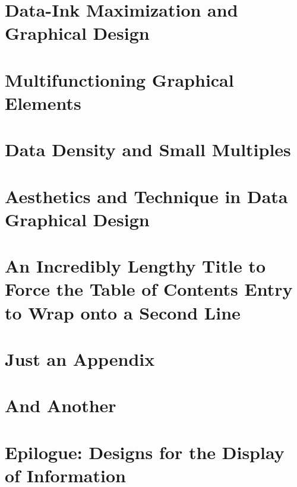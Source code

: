 \documentclass{bayeshyp}
\begin{document}
\chapter{Data-Ink Maximization and Graphical Design}
\setcounter{page}{123}

\chapter{Multifunctioning Graphical Elements}
\setcounter{page}{139}

\chapter{Data Density and Small Multiples}
\setcounter{page}{161}

\chapter{Aesthetics and Technique in Data Graphical Design}
\setcounter{page}{177}

\chapter{An Incredibly Lengthy Title to Force the Table of Contents Entry to Wrap onto a Second Line}
\setcounter{page}{181}

\appendix

\chapter{Just an Appendix}
\setcounter{page}{183}

\chapter{And Another}
\setcounter{page}{185}

\backmatter
\chapter{Epilogue: Designs for the Display of Information}
\setcounter{page}{191}
\end{document}
